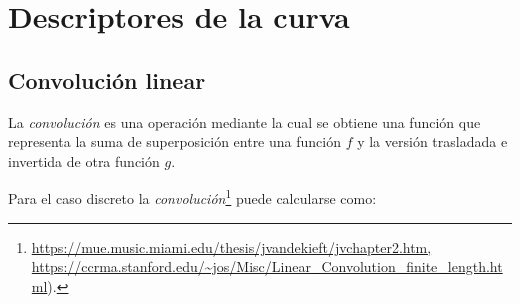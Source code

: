 \begin{comment}
\subsection{Curva de aprendizaje, matriz de confusi\'on}
\subsection{M\'etricas}
\subsubsection{Validaci\'on cruzada}
\subsubsection{Presici\'on, recobrado y medida f0.}


\subsection{Feature selection}
\subsection{Correlation, anova test, feature importance}
\subsection{Dataset balanceado}
\subsection{Overfitting y underfitting}
\end{comment}




\section{Descriptores de la curva} 
\subsection{Convoluci\'on linear}

La \emph{convoluci\'on} es una operaci\'on mediante la cual se obtiene una funci\'on que representa la suma de superposici\'on entre una funci\'on $f$ y la versi\'on trasladada e invertida de otra funci\'on $g$.


Para el caso discreto la \emph{convoluci\'on}\footnote{ \url{https://mue.music.miami.edu/thesis/jvandekieft/jvchapter2.htm, https://ccrma.stanford.edu/~jos/Misc/Linear_Convolution_finite_length.html}).}  puede calcularse como:

